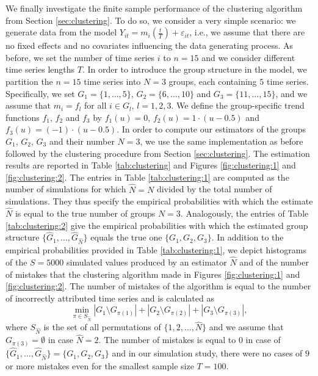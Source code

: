 \documentclass[a4paper,12pt]{article}
\begin{document}
We finally investigate the finite sample performance of the clustering algorithm from Section \ref{sec:clustering}. To do so, we consider a very simple scenario: we generate data from the model $Y_{it} = m_i(\frac{t}{T}) + \varepsilon_{it}$, i.e., we assume that there are no fixed effects and no covariates influencing the data generating process. As before, we set the number of time series $i$ to $n = 15$ and we consider different time series lengths $T$. In order to introduce the group structure in the model, we partition the $n = 15$ time series into $N=3$ groups, each containing $5$ time series. Specifically, we set $G_1 = \{1,\ldots, 5\}$, $G_2 = \{6,\ldots, 10\}$ and $G_3 =  \{11,\ldots, 15\}$, and we assume that $m_i = f_l$ for all $i \in G_l$, $l = 1, 2, 3$. We define the group-specific trend functions $f_1$, $f_2$ and $f_3$ by $f_1(u) = 0$, $f_2(u) = 1 \cdot (u - 0.5)$ and $f_3(u) =  (- 1) \cdot (u - 0.5)$. In order to compute our estimators of the groups $G_1$, $G_2$, $G_3$ and their number $N = 3$, we use the same implementation as before followed by the clustering procedure from Section \ref{sec:clustering}. The estimation results are reported in Table \ref{tab:clustering} and Figures \ref{fig:clustering:1} and \ref{fig:clustering:2}. The entries in Table \ref{tab:clustering:1} are computed as the number of simulations for which $\widehat{N} = N$ divided by the total number of simulations. They thus specify the empirical probabilities with which the estimate $\widehat{N}$ is equal to the true number of groups $N = 3$. Analogously, the entries of Table \ref{tab:clustering:2} give the empirical probabilities with which the estimated group structure $\{ \widehat{G}_1,\ldots,\widehat{G}_{\widehat{N}}\}$ equals the true one $\{G_1,G_2,G_3\}$. In addition to the empirical probabilities provided in Table \ref{tab:clustering:1}, we depict histograms of the $S = 5000$ simulated values produced by an estimator $\hat{N}$ and of the number of mistakes that the clustering algorithm made in Figures \ref{fig:clustering:1} and \ref{fig:clustering:2}. The number of mistakes of the algorithm is equal to the number of incorrectly attributed time series and is calculated as 
$$\min_{\pi \in S_{\hat{N}}} |G_1 \setminus G_{\pi(1)}| +|G_2 \setminus G_{\pi(2)}| + |G_3 \setminus G_{\pi(3)}|,$$
where $S_{\hat{N}}$ is the set of all permutations of $\{1, 2, \ldots, \hat{N}\}$ and we assume that $G_{\pi(3)} = \emptyset$ in case $\hat{N} = 2$. The number of mistakes is equal to $0$ in case of $\{ \widehat{G}_1,\ldots,\widehat{G}_{\widehat{N}}\} = \{ G_1,G_2,G_3\}$ and in our simulation study, there were no cases of $9$ or more mistakes even for the smallest sample size $T = 100$.
\end{document}
